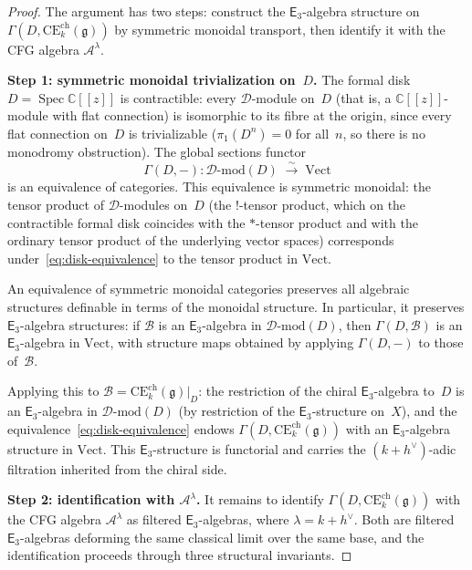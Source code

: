\documentclass[11pt,reqno]{amsart}
\theoremstyle{definition}
\theoremstyle{remark}
\newcommand{\cA}{\mathcal{A}}
\newcommand{\cB}{\mathcal{B}}
\newcommand{\cD}{\mathcal{D}}
\newcommand{\CE}{\mathrm{CE}}
\newcommand{\Ethree}{\mathsf{E}_{3}}
\DeclareMathOperator{\Spec}{Spec}
\newcommand{\fg}{\mathfrak{g}}
\newcommand{\CC}{\mathbb{C}}
\numberwithin{equation}{section}
\begin{document}
\begin{proof}
The argument has two steps: construct the $\Ethree$-algebra
structure on $\Gamma(D, \CE^{\mathrm{ch}}_k(\fg))$
by symmetric monoidal transport, then identify it with the
CFG algebra $\cA^\lambda$.

\smallskip
\noindent\textbf{Step 1: symmetric monoidal trivialization
on~$D$.}
The formal disk $D = \Spec \CC[[z]]$ is contractible:
every $\cD$-module on~$D$ (that is, a $\CC[[z]]$-module
with flat connection) is isomorphic to its fibre at the
origin, since every flat connection on~$D$ is
trivializable ($\pi_1(D^n) = 0$ for all~$n$, so there is
no monodromy obstruction). The global sections functor
\begin{equation}\label{eq:disk-equivalence}
  \Gamma(D, -) \colon
  \cD\textrm{-}\mathrm{mod}(D) \;\xrightarrow{\;\sim\;}\;
  \mathrm{Vect}
\end{equation}
is an equivalence of categories. This equivalence is
symmetric monoidal: the tensor product of $\cD$-modules
on~$D$ (the $!$-tensor product, which on the contractible
formal disk coincides with the $*$-tensor product and with
the ordinary tensor product of the underlying vector
spaces) corresponds under~\eqref{eq:disk-equivalence} to
the tensor product in $\mathrm{Vect}$.

An equivalence of symmetric monoidal categories preserves
all algebraic structures definable in terms of the monoidal
structure. In particular, it preserves $\Ethree$-algebra
structures: if $\cB$ is an $\Ethree$-algebra in
$\cD\textrm{-}\mathrm{mod}(D)$, then
$\Gamma(D, \cB)$ is an $\Ethree$-algebra in
$\mathrm{Vect}$, with structure maps obtained by applying
$\Gamma(D, -)$ to those of~$\cB$.

Applying this to
$\cB = \CE^{\mathrm{ch}}_k(\fg)\big|_D$: the
restriction of the chiral $\Ethree$-algebra to~$D$ is an
$\Ethree$-algebra in $\cD\textrm{-}\mathrm{mod}(D)$ (by
restriction of the $\Ethree$-structure on~$X$), and the
equivalence~\eqref{eq:disk-equivalence} endows
$\Gamma(D, \CE^{\mathrm{ch}}_k(\fg))$ with an
$\Ethree$-algebra structure in $\mathrm{Vect}$. This
$\Ethree$-structure is functorial and carries the
$(k+h^\vee)$-adic filtration inherited from the chiral side.

\smallskip
\noindent\textbf{Step 2: identification with $\cA^\lambda$.}
It remains to identify
$\Gamma(D, \CE^{\mathrm{ch}}_k(\fg))$ with the CFG
algebra $\cA^\lambda$ as filtered $\Ethree$-algebras,
where $\lambda = k + h^\vee$. Both are filtered
$\Ethree$-algebras deforming the same classical limit over
the same base, and the identification proceeds through
three structural invariants.


\end{proof}
\end{document}
